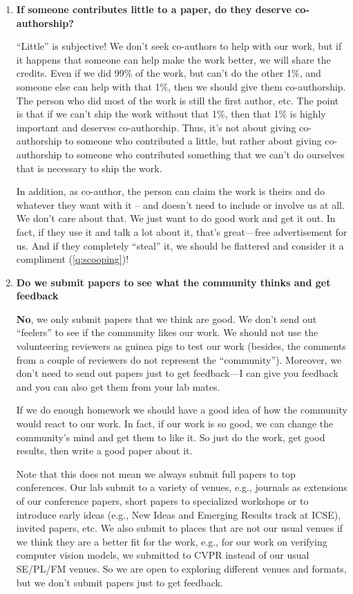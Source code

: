 \documentclass{article}
\begin{document}
\begin{enumerate}[label=\arabic*.]
    \item \textbf{If someone contributes little to a paper, do they deserve co-authorship?}
    
    ``Little'' is subjective!  We don't seek co-authors to help with our work, but if it happens that someone can help make the work better, we will share the credits. Even if we did 99\% of the work, but can't do the other 1\%, and someone else can help with that 1\%, then we should give them co-authorship. The person who did most of the work is still the first author, etc.  The point is that if we can't ship the work without that 1\%, then that 1\% is highly important and deserves co-authorship.  Thus, it's not about giving co-authorship to someone who contributed a little, but rather about giving co-authorship to someone who contributed something that we can't do ourselves that is necessary to ship the work.

    In addition, as co-author, the person can claim the work is theirs and do whatever they want with it -- and doesn't need to include or involve us at all.  We don't care about that.  We just want to do good work and get it out. In fact, if they use it and talk a lot about it, that's great---free advertisement for us.  And if they completely ``steal'' it, we should be flattered and consider it a compliment (\autoref{q:scooping})!

    \item \label{q:feedback}\textbf{Do we submit papers to see what the community thinks and get feedback}
    
    \textbf{No}, we only submit papers that we think are good. We don't send out ``feelers'' to see if the community likes our work.   We  should not use the volunteering reviewers as guinea pigs to test our work (besides, the comments from a couple of reviewers do not represent the ``community''). Moreover, we don't need to send out papers just to get feedback---I can give you feedback and you can also get them from your lab mates.
    
    If we do enough homework we should have a good idea of how the community would react to our work. In fact, if our work is so good, we can change the community's mind and get them to like it. So just do the work, get good results, then write a good paper about it.  

    Note that this does not mean we always submit full papers to top conferences. Our lab submit to a variety of venues, e.g., journals as extensions of our conference papers, short papers to specialized workshops or to introduce early ideas (e.g., New Ideas and Emerging Results track at ICSE), invited papers, etc.  
    We also submit to places that are not our usual venues if we think they are a better fit for the work, e.g., for our work on verifying computer vision models, we submitted to CVPR instead of our usual SE/PL/FM venues.
    So we are open to exploring different venues and formats, but we don't submit papers just to get feedback.


\end{enumerate}
\end{document}

